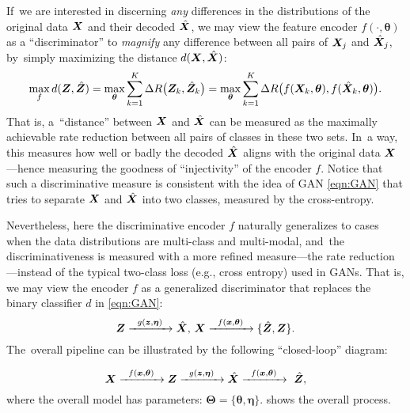 \documentclass[../../book-main.tex]{subfiles}
\begin{document}
{If~we are interested in discerning {\em any} differences in the distributions of the original data $\bm{X}$ and their decoded $\hat {\bm{X}}$, we may view the feature encoder $f(\cdot, \bm \theta)$ as a ``discriminator'' to {\em magnify} any difference between all pairs of $\bm{X}_j$ and $\hat {\bm{X}}_j$, by~simply maximizing the distance $d(\bm{X}, \hat {\bm{X}})$:
\begin{equation}
\max_f d(\bm{Z}, \hat {\bm{Z}}) = \max_{\bm \theta} \sum_{k=1}^K \Delta R\big(\bm{Z}_k, \hat{\bm{Z}}_k\big) = \max_{\bm \theta} \sum_{k=1}^K \Delta R\big(f(\bm{X}_k,\bm \theta), f(\hat{\bm{X}}_k,\bm \theta)\big).
    \label{eqn:max-distance}
\end{equation}
That is, a~``distance'' between $\bm{X}$ and $\hat {\bm{X}}$ can be measured as the maximally achievable rate reduction between all pairs of classes in these two sets. In~a way, this measures how well or badly the decoded $\hat {\bm{X}}$ aligns with the original data $\bm{X}$---hence measuring the goodness of ``injectivity'' of the encoder $f$. Notice that such a discriminative measure is consistent with the idea of GAN \eqref{eqn:GAN} that tries to separate $\bm{X}$ and $\hat {\bm{X}}$ into two classes, measured by the cross-entropy. 

Nevertheless, here the  discriminative encoder $f$ naturally generalizes to cases when the data distributions are multi-class and multi-modal, and~the discriminativeness is measured with a more refined measure---the rate reduction---instead of the typical two-class loss (e.g., cross entropy) used in GANs. That is, we may view the encoder $f$ as a generalized discriminator that replaces the binary classifier $d$ in \eqref{eqn:GAN}:
\begin{equation}
 \bm{Z} \xrightarrow{\hspace{2mm} g(\bm{z},\bm \eta) \hspace{2mm}} \hat {\bm{X}}, \, \bm{X} \xrightarrow{\hspace{2mm} f(\bm{x}, \bm \theta)\hspace{2mm}} \{\hat {\bm{Z}}, \bm{Z}\}.
 \label{eqn:closed-loop-GAN}
\end{equation}
The~overall pipeline can be illustrated by the following ``closed-loop''  diagram:}
\begin{equation}
    \bm{X} \xrightarrow{\hspace{2mm} f(\bm{x}, \bm \theta)\hspace{2mm}} \bm{Z} \xrightarrow{\hspace{2mm} g(\bm{z},\bm \eta) \hspace{2mm}} \hat {\bm{X}} \xrightarrow{\hspace{2mm} f(\bm{x}, \bm \theta)\hspace{2mm}} \ \hat {\bm{Z}}, 
\end{equation}
where the overall model has parameters: $\bm \Theta = \{\bm \theta, \bm \eta\}$.  shows the overall process.  
\end{document}
